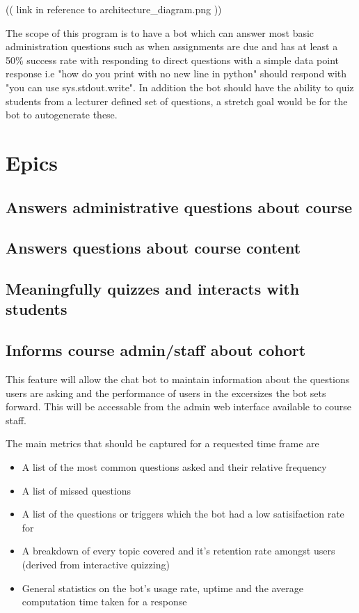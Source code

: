 \documentclass{article}
\begin{document}
(( link in reference to architecture_diagram.png ))

The scope of this program is to have a bot which can answer most basic administration questions such as when assignments are due and has at least a 50\% success rate with responding to direct questions with a simple data point response i.e 
"how do you print with no new line in python" should respond with "you can use sys.stdout.write". In addition the bot should have the ability to quiz students from a lecturer defined set of questions, a stretch goal would be for the bot to autogenerate these.

\section{Epics}
\subsection{Answers administrative questions about course}


\subsection{Answers questions about course content}


\subsection{Meaningfully quizzes and interacts with students}


\subsection{Informs course admin/staff about cohort}

This feature will allow the chat bot to maintain information about the questions users are asking and the performance of users in the excersizes the bot sets forward. This will be accessable from the admin web interface available to course staff.

The main metrics that should be captured for a requested time frame are
\begin{itemize}
  \item A list of the most common questions asked and their relative frequency
  \item A list of missed questions
  \item A list of the questions or triggers which the bot had a low satisifaction rate for
  \item A breakdown of every topic covered and it's retention rate amongst users (derived from interactive quizzing)
  \item General statistics on the bot's usage rate, uptime and the average computation time taken for a response
\end{itemize}
\end{document}

